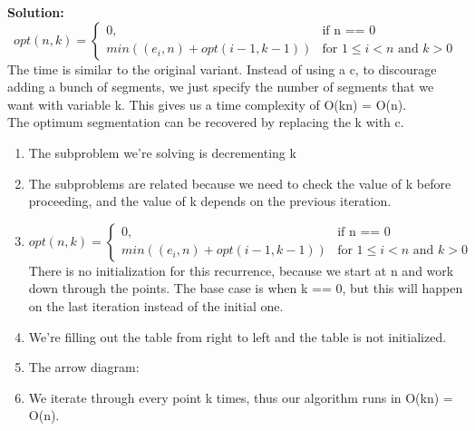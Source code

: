\documentclass[11pt]{article}
\begin{document}
\begin{enumerate}
\textbf{Solution:}\\
\begin{equation}
opt (n, k)=\begin{cases}
0, & \text{if n == 0}\\
min ((e_i, n) + opt (i-1, k-1)) & \text{for $1 \leq i < n$ and $k > 0$}
\end{cases}
\end{equation}
The time is similar to the original variant. Instead of using a c, to discourage adding a bunch of segments, we just specify the number of segments that we want with variable k. This gives us a time complexity of O(kn) = O(n).\\
The optimum segmentation can be recovered by replacing the k with c.
\begin{enumerate}
\item
The subproblem we're solving is decrementing k
\item
The subproblems are related because we need to check the value of k before proceeding, and the value of k depends on the previous iteration.
\item
\begin{equation}
opt (n, k)=\begin{cases}
0, & \text{if n == 0}\\
min ((e_i, n) + opt (i-1, k-1)) & \text{for $1 \leq i < n$ and $k > 0$}
\end{cases}
\end{equation}
There is no initialization for this recurrence, because we start at n and work down through the points. The base case is when k == 0, but this will happen on the last iteration instead of the initial one.
\item
We're filling out the table from right to left and the table is not initialized.
\item
The arrow diagram:
\vspace*{3cm}
\item
We iterate through every point k times, thus our algorithm runs in O(kn) = O(n). 
\end{enumerate}
\end{enumerate}
\end{document}
